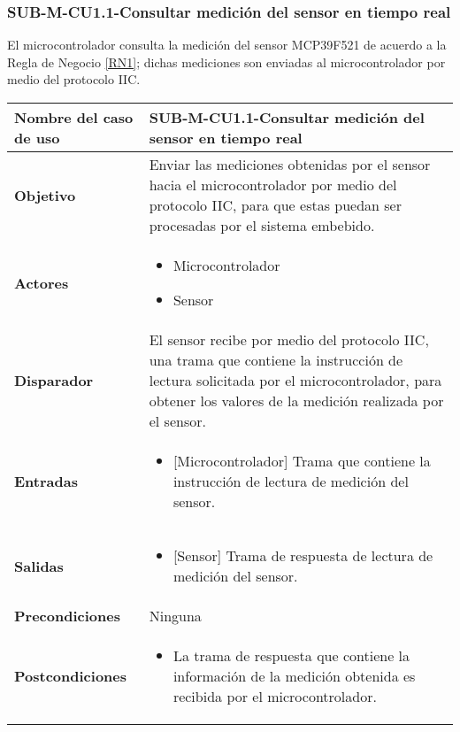 \subsubsection{SUB-M-CU1.1-Consultar medición del sensor en tiempo real}\label{SUB-M-CU1.1}
El microcontrolador consulta la medición del sensor MCP39F521 de acuerdo a la Regla de Negocio \ref{RN1}; dichas mediciones son enviadas al microcontrolador por medio del protocolo IIC.
\begin{longtable}{|J{5cm}|J{10.3cm}|}
	\hline
	\textbf{Nombre del caso de uso} &
		SUB-M-CU1.1-Consultar medición del sensor en tiempo real \\ \hline
	\textbf{Objetivo} &
		Enviar las mediciones obtenidas por el sensor hacia el microcontrolador por medio del protocolo IIC, para que estas puedan ser procesadas por el sistema embebido. \\ \hline
	\textbf{Actores} &
	    \begin{itemize}
		    \item Microcontrolador
		    \item Sensor
		\end{itemize}\\ \hline 
	\textbf{Disparador} & 
		El sensor recibe por medio del protocolo IIC, una trama que contiene la instrucción de lectura solicitada por el microcontrolador, para obtener los valores de la medición realizada por el sensor. \\ \hline 
	\textbf{Entradas} & 
		\begin{itemize}
				\item {[Microcontrolador]} Trama que contiene la instrucción de lectura de medición del sensor.
		\end{itemize}\\ \hline 
	\textbf{Salidas} & 
	    \begin{itemize}
	        \item {[Sensor]} Trama de respuesta de lectura de medición del sensor.
	    \end{itemize}\\ \hline
	\textbf{Precondiciones} & 
		Ninguna \\ \hline
	\textbf{Postcondiciones} &
		\begin{itemize}
			\item La trama de respuesta que contiene la información de la medición obtenida es recibida por el microcontrolador.

\end{itemize}
\end{longtable}
